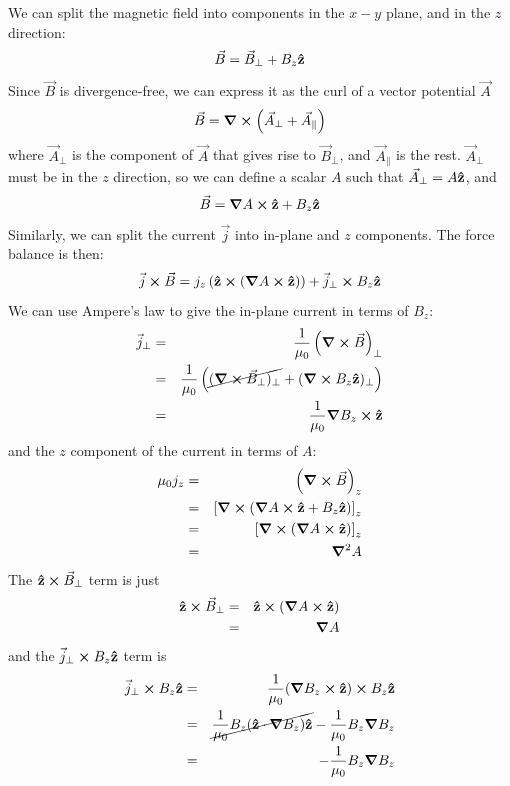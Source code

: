 \documentclass[%
 reprint,
 amsmath,amssymb,
 aps,
]{revtex4-2}
\begin{document}
We can split the magnetic field into components in the $x-y$ plane, and in the $z$ direction:
\begin{equation}
\vec B = \vec B_\perp + B_z \vu z
\end{equation}
Since $\vec B$ is divergence-free, we can express it as the curl of a vector potential $\vec A$
\begin{equation}
\vec B = \curl (\vec A_\perp + \vec A_\parallel)
\end{equation}
where $\vec A_\perp$ is the component of $\vec A$ that gives rise to $\vec B_\perp$, and $\vec A_\parallel$ is the rest. $\vec A_\perp$ must be in the $z$ direction, so we can define a scalar $A$ such that $\vec A_\perp = A \vu z$, and
\begin{equation}
\vec B = \grad A \cross \vu z + B_z \vu z
\end{equation}
Similarly, we can split the current $\vec j$ into in-plane and $z$ components. The force balance is then:
\begin{equation}
\vec j \cross \vec B = j_z \left(\vu z \cross (\grad A \cross \vu z) \right) + \vec j_\perp \cross B_z \vu z
\end{equation}
We can use Ampere's law to give the in-plane current in terms of $B_z$:
\begin{eqnarray}
\vec j _\perp & = & \frac{1}{\mu_0} \left( \curl \vec B \right)_\perp \\
& = & \frac{1}{\mu_0} \left( \cancel{(\curl \vec B_\perp)_\perp} + (\curl B_z \vu z)_\perp \right) \\
& = & \frac{1}{\mu_0} \grad B_z \cross \vu z
\end{eqnarray}
and the $z$ component of the current in terms of $A$:
\begin{eqnarray}
\mu_0 j _z & = & \left( \curl \vec B \right)_z \\
& = & \left[ \curl (\grad A \cross \vu z + B_z \vu z ) \right]_z \\
& = & \left[ \curl (\grad A \cross \vu z) \right]_z \\
& = & \grad ^2 A
\end{eqnarray}
The $\vu z \cross \vec B_\perp$ term is just
\begin{eqnarray}
\vu z \cross \vec B_\perp & = & \vu z \cross (\grad A \cross \vu z) \\
& = & \grad A
\end{eqnarray}
and the $\vec j_\perp \cross B_z \vu z$ term is
\begin{eqnarray}
\vec j_\perp \cross B_z \vu z & = & \frac{1}{\mu_0} (\grad B_z \cross \vu z) \cross B_z \vu z \\
& = & \cancel{\frac{1}{\mu_0} B_z (\vu z \cdot \grad B_z) \vu z} - \frac{1}{\mu_0} B_z \grad B_z \\
& = & - \frac{1}{\mu_0} B_z \grad B_z
\end{eqnarray}
\end{document}
